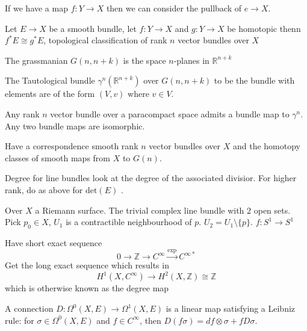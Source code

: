 If we have a map $ f: Y \rightarrow X $ then we can consider the pullback of $ e \rightarrow X $. 


\begin{proposition}
    Let $E \rightarrow X $ be a smooth bundle, let $ f: Y \rightarrow  X $ 
    and $ g: Y \rightarrow X $ be homotopic thenn $ f^* E \cong g^* E $, 
    topological classification of rank $n$ vector bundles over $ X $ 
\end{proposition}

\begin{definition}
    The grassmanian $G(n, n+k) $ is the space $n$-planes in $ \mathbb{R} ^{n+k} $
\end{definition}

\begin{definition}
     The Tautological bundle $ \gamma^n ( \mathbb{R} ^{n+k} ) $ over $ G(n, n+k) $
     to be the bundle with elements are of the form $ (V, v) $ where $ v \in V$. 
\end{definition}

\begin{theorem}
    Any rank $n$ vector bundle over a paracompact space admits a bundle map to $ \gamma^n $. 
    Any two bundle maps are isomorphic. 
\end{theorem}

Have a correspondence smooth rank $n$ vector bundles over $ X $ 
and the homotopy classes of smooth maps from $ X $ to $ G(n) $. 

Degree for line bundles look at the degree of the associated divisior. 
For higher rank, do as above for $ \mathrm{det} ( E) $ . 


Over $ X$ a Riemann surface. 
The trivial complex line bundle with $ 2$ open sets. 
Pick  $p_0 \in X $, $U_1 $ is a contractible neighbourhood of $p$.
$ U_2  = U_1 \setminus \{p\} $. 
$f : S^1 \rightarrow S^1 $ 

Have short exact sequence 
\begin{equation}
    0 \rightarrow  \mathbb{Z}  \rightarrow  C^\infty \xrightarrow{\mathrm{exp}} C^{\infty *}
\end{equation}
Get the long exact sequence which results in 
\begin{equation}
    H^1 ( X, C^\infty ) \rightarrow H^2( X, \mathbb{Z} ) \cong \mathbb{Z} 
\end{equation}
which is otherwise known as the degree map

\begin{definition}
 A connection $ D: \Omega^0 ( X, E) \rightarrow  \Omega ^1 ( X, E) $ is a linear map satisfying a Leibniz rule:
    for $ \sigma \in \Omega^0 ( X, E) $ and $f \in C^\infty $, then 
    $ D(f \sigma) = df \otimes \sigma + f D\sigma$. 
\end{definition}

